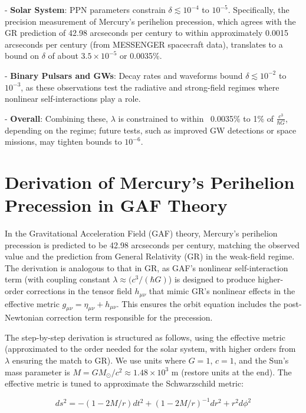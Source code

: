 \documentclass{article}
\begin{document}
- \textbf{Solar System}: PPN parameters constrain \(\delta \lesssim 10^{-4}\) to \(10^{-5}\). Specifically, the precision measurement of Mercury's perihelion precession, which agrees with the GR prediction of 42.98 arcseconds per century to within approximately 0.0015 arcseconds per century (from MESSENGER spacecraft data)\cite{Park2017, Verma2018, Will2014}, translates to a bound on \(\delta\) of about \(3.5 \times 10^{-5}\) or 0.0035\%.

- \textbf{Binary Pulsars and GWs}: Decay rates and waveforms bound \(\delta \lesssim 10^{-2}\) to \(10^{-3}\), as these observations test the radiative and strong-field regimes where nonlinear self-interactions play a role\cite{Weisberg2016, Yunes2010, Cornish2018, Abbott2019}.

- \textbf{Overall}: Combining these, \(\lambda\) is constrained to within ~0.0035\% to 1\% of \(\frac{c^3}{\hbar G}\), depending on the regime; future tests, such as improved GW detections or space missions, may tighten bounds to \(10^{-6}\)\cite{Guo2023}.

\section{Derivation of Mercury's Perihelion Precession in GAF Theory}

In the Gravitational Acceleration Field (GAF) theory, Mercury's perihelion precession is predicted to be 42.98 arcseconds per century, matching the observed value and the prediction from General Relativity (GR) in the weak-field regime. The derivation is analogous to that in GR, as GAF's nonlinear self-interaction term (with coupling constant \(\lambda \approx (c^3 / (\hbar G)\)) is designed to produce higher-order corrections in the tensor field \(h_{\mu\nu}\) that mimic GR's nonlinear effects in the effective metric \(g_{\mu\nu} = \eta_{\mu\nu} + h_{\mu\nu}\). This ensures the orbit equation includes the post-Newtonian correction term responsible for the precession.

The step-by-step derivation is structured as follows, using the effective metric (approximated to the order needed for the solar system, with higher orders from \(\lambda\) ensuring the match to GR). We use units where \(G = 1\), \(c = 1\), and the Sun's mass parameter is \(M = GM_\odot / c^2 \approx 1.48 \times 10^3\) m (restore units at the end). The effective metric is tuned to approximate the Schwarzschild metric:

\begin{equation}
ds^2 = - (1 - 2M/r) dt^2 + (1 - 2M/r)^{-1} dr^2 + r^2 d\phi^2
\end{equation}
\end{document}
